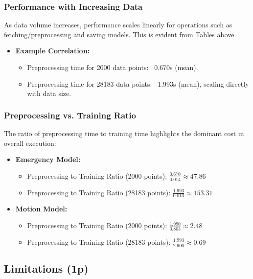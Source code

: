 \documentclass[A4,10pt]{article}
\begin{document}
\subsubsection{Performance with Increasing Data}
As data volume increases, performance scales linearly for operations such as fetching/preprocessing and saving models. This is evident from Tables above.

\begin{itemize}
    \item \textbf{Example Correlation:}
    \begin{itemize}
        \item Preprocessing time for 2000 data points: ~0.670s (mean).
        \item Preprocessing time for 28183 data points: ~1.993s (mean), scaling directly with data size.
    \end{itemize}
\end{itemize}

\subsubsection{Preprocessing vs. Training Ratio}
The ratio of preprocessing time to training time highlights the dominant cost in overall execution:

\begin{itemize}
    \item \textbf{Emergency Model:}
    \begin{itemize}
        \item Preprocessing to Training Ratio (2000 points): \( \frac{0.670}{0.014} \approx 47.86 \)
        \item Preprocessing to Training Ratio (28183 points): \( \frac{1.993}{0.013} \approx 153.31 \)
    \end{itemize}
    \item \textbf{Motion Model:}
    \begin{itemize}
        \item Preprocessing to Training Ratio (2000 points): \( \frac{1.990}{0.803} \approx 2.48 \)
        \item Preprocessing to Training Ratio (28183 points): \( \frac{1.993}{2.906} \approx 0.69 \)
    \end{itemize}
\end{itemize}

\subsection{Limitations (1p)}
\end{document}
